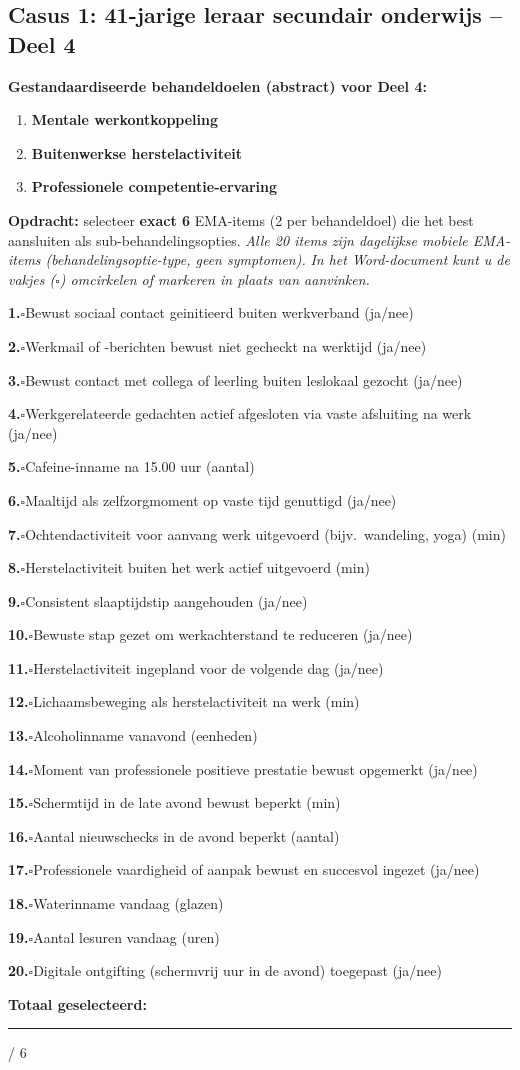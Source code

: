 \documentclass[11pt,a4paper]{article}
\newcommand{\checkitemBFS}[2]{%
\noindent\small\textbf{#1.}\hspace{0.45em}$\square$\hspace{0.4em}#2\par\vspace{0.20em}}
\begin{document}
\newpage
\subsection*{Casus 1: 41-jarige leraar secundair onderwijs -- Deel 4}

\begin{contextbox}
\small\textbf{Gestandaardiseerde behandeldoelen (abstract) voor Deel 4:}
\begin{enumerate}[topsep=2pt,itemsep=1pt,label=\arabic*.]
\item \textbf{Mentale werkontkoppeling}
\item \textbf{Buitenwerkse herstelactiviteit}
\item \textbf{Professionele competentie-ervaring}
\end{enumerate}
\end{contextbox}

\begin{responsebox}
\small\textbf{Opdracht:} selecteer \textbf{exact 6} EMA-items (2 per behandeldoel) die het best aansluiten als sub-behandelingsopties.
\textit{Alle 20 items zijn dagelijkse mobiele EMA-items (behandelingsoptie-type, geen symptomen).}
\textit{In het Word-document kunt u de vakjes ($\square$) omcirkelen of markeren in plaats van aanvinken.}

\checkitemBFS{1}{Bewust sociaal contact geinitieerd buiten werkverband (ja/nee)}
\checkitemBFS{2}{Werkmail of -berichten bewust niet gecheckt na werktijd (ja/nee)}
\checkitemBFS{3}{Bewust contact met collega of leerling buiten leslokaal gezocht (ja/nee)}
\checkitemBFS{4}{Werkgerelateerde gedachten actief afgesloten via vaste afsluiting na werk (ja/nee)}
\checkitemBFS{5}{Cafeine-inname na 15.00 uur (aantal)}
\checkitemBFS{6}{Maaltijd als zelfzorgmoment op vaste tijd genuttigd (ja/nee)}
\checkitemBFS{7}{Ochtendactiviteit voor aanvang werk uitgevoerd (bijv.\ wandeling, yoga) (min)}
\checkitemBFS{8}{Herstelactiviteit buiten het werk actief uitgevoerd (min)}
\checkitemBFS{9}{Consistent slaaptijdstip aangehouden (ja/nee)}
\checkitemBFS{10}{Bewuste stap gezet om werkachterstand te reduceren (ja/nee)}
\checkitemBFS{11}{Herstelactiviteit ingepland voor de volgende dag (ja/nee)}
\checkitemBFS{12}{Lichaamsbeweging als herstelactiviteit na werk (min)}
\checkitemBFS{13}{Alcoholinname vanavond (eenheden)}
\checkitemBFS{14}{Moment van professionele positieve prestatie bewust opgemerkt (ja/nee)}
\checkitemBFS{15}{Schermtijd in de late avond bewust beperkt (min)}
\checkitemBFS{16}{Aantal nieuwschecks in de avond beperkt (aantal)}
\checkitemBFS{17}{Professionele vaardigheid of aanpak bewust en succesvol ingezet (ja/nee)}
\checkitemBFS{18}{Waterinname vandaag (glazen)}
\checkitemBFS{19}{Aantal lesuren vandaag (uren)}
\checkitemBFS{20}{Digitale ontgifting (schermvrij uur in de avond) toegepast (ja/nee)}
\vspace{0.4em}
\noindent\textbf{Totaal geselecteerd:}\hspace{0.5em}\rule{1.2cm}{0.25pt}\hspace{0.2em}/ 6
\end{responsebox}
\end{document}
